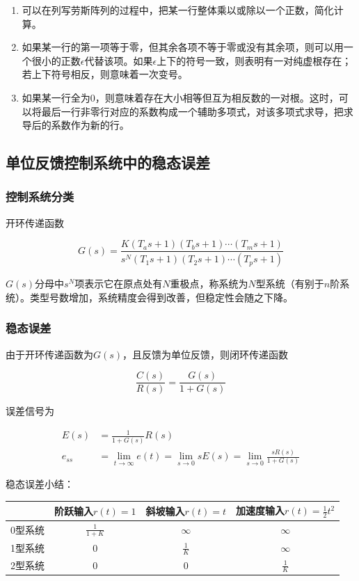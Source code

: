 \begin{enumerate}
	\item	可以在列写劳斯阵列的过程中，把某一行整体乘以或除以一个正数，简化计算。
	\item	如果某一行的第一项等于零，但其余各项不等于零或没有其余项，则可以用一个很小的正数$\epsilon$代替该项。如果$\epsilon$上下的符号一致，则表明有一对纯虚根存在；若上下符号相反，则意味着一次变号。
	\item	如果某一行全为0，则意味着存在大小相等但互为相反数的一对根。这时，可以将最后一行非零行对应的系数构成一个辅助多项式，对该多项式求导，把求导后的系数作为新的行。
\end{enumerate}

\subsection{单位反馈控制系统中的稳态误差}

\subsubsection{控制系统分类}

开环传递函数

\begin{equation*}
G(s)=\frac{K(T_as+1)(T_bs+1)\cdots(T_ms+1)}{s^N(T_1s+1)(T_2s+1)\cdots(T_ps+1)}
\end{equation*}

$G(s)$分母中$s^N$项表示它在原点处有$N$重极点，称系统为$N$型系统（有别于$n$阶系统）。类型号数增加，系统精度会得到改善，但稳定性会随之下降。

\subsubsection{稳态误差}

由于开环传递函数为$G(s)$，且反馈为单位反馈，则闭环传递函数

\begin{equation*}
\frac{C(s)}{R(s)}=\frac{G(s)}{1+G(s)}
\end{equation*}

误差信号为

\begin{align*}
E(s)&=\frac{1}{1+G(s)}R(s)\\
e_{ss}&=\lim_{t\to\infty}e(t)=\lim_{s\to0}sE(s)=\lim_{s\to0}\frac{sR(s)}{1+G(s)}
\end{align*}

稳态误差小结：

\begin{center}
	\begin{tabular}{|c|c|c|c|}
			\hline
				&	阶跃输入$r(t)=1$	&	斜坡输入$r(t)=t$	&	加速度输入$r(t)=\frac12t^2$\\\hline
			0型系统&	$\frac{1}{1+K}$	&$\infty$	&	$\infty$\\\hline
			1型系统&$0$	&$\frac1K$&$\infty$\\\hline
			2型系统&$0$	&$0$	&$\frac1K$\\\hline
	\end{tabular}
\end{center}






